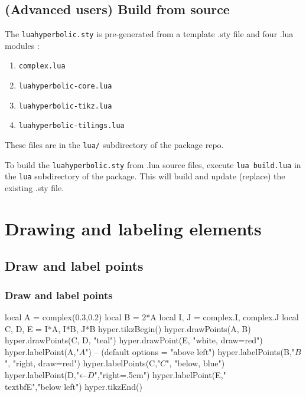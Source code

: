 \documentclass{article}
\begin{document}
\subsection{(Advanced users) Build from source}

The \texttt{luahyperbolic.sty}  is pre-generated from a template .sty file and four .lua modules :
\begin{enumerate}
\item \texttt{complex.lua}
\item \texttt{luahyperbolic-core.lua}
\item \texttt{luahyperbolic-tikz.lua}
\item \texttt{luahyperbolic-tilings.lua}
\end{enumerate}

These files are in the \texttt{lua/} subdirectory of the package repo. 

To build the \texttt{luahyperbolic.sty} from .lua source files, execute \texttt{lua build.lua} in the \texttt{lua} subdirectory of the package.
This will build and update (replace) the existing .sty file.




\section{Drawing and labeling elements}


\subsection{Draw and label points}

\subsubsection{Draw and label points}
\begin{codeandresult}
\begin{luacode*}
local A = complex(0.3,0.2)
local B = 2*A
local I, J = complex.I, complex.J
local C, D, E = I*A, I*B, J*B
hyper.tikzBegin()
hyper.drawPoints(A, B)
hyper.drawPoints(C, D, "teal")
hyper.drawPoint(E, "white, draw=red")
hyper.labelPoint(A,"$A$") 
-- (default options = "above left")
hyper.labelPoints(B,"$B$", "right, draw=red")
hyper.labelPoints(C,"$C$", "below, blue")
hyper.labelPoint(D,"←$D$","right=.5cm")
hyper.labelPoint(E,"\\textbf{E}","below left")
hyper.tikzEnd()
\end{luacode*}
\end{codeandresult}
\end{document}
